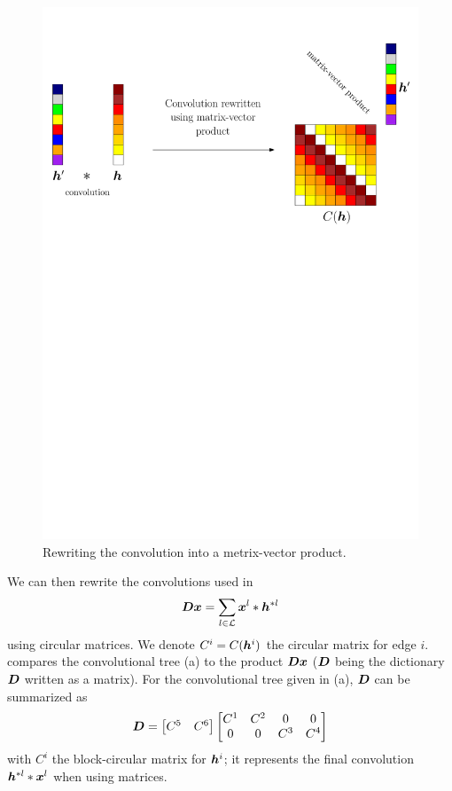 \begin{figure}[!ht] \centering
\includegraphics[width=\textwidth]{figures/block-circulant_matrix.pdf}
\caption{Rewriting the convolution into a metrix-vector product.} \label{fig_block_circular}
\end{figure}

We can then rewrite the convolutions used in
$$\bm{D}\bm{x} = \sum_{l \in \mathcal L} \bm{x}^l * \bm{h}^{*l}$$
using circular matrices. We denote $C^i = C(\bm{h}^i)$ the circular matrix for edge $i$.  compares the convolutional tree (a) to the product $\bm{D}\bm{x}$ ($\bm{D}$ being the dictionary $\bm{D}$ written as a matrix). For the convolutional tree given in (a), $\bm{D}$ can be summarized as
\begin{align}
\bm{D} = \begin{bmatrix}C^5 & C^6\end{bmatrix} \begin{bmatrix}C^1 & C^2 & 0 & 0 \\0 & 0 & C^3 & C^4\end{bmatrix} \label{eq_matrix_developed}
\end{align}
with $C^i$ the block-circular matrix for $\bm{h}^i$; it represents the final convolution $\bm{h}^{*l}*\bm{x}^l$ when using matrices.

